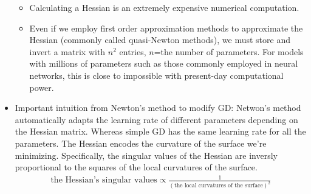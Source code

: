 \documentclass[norsk,a4paper,11pt]{article}
\begin{document}
\begin{itemize}
		\begin{itemize}
			\item Calculating a Hessian is an extremely expensive numerical computation.
			\item Even if we employ first order approximation methods to approximate the Hessian (commonly called quasi-Newton methods), we must store and invert a matrix with $n^2$ entries, $n$=the number of parameters. For models with millions of parameters such as those commonly employed in neural networks, this is close to impossible with present-day computational power. 
		\end{itemize}
		\item Important intuition from Newton's method to modify GD: Netwon's method automatically adapts the learning rate of different parameters depending on the Hessian matrix. Whereas simple GD has the same learning rate for all the parameters. The Hessian encodes the curvature of the surface we're minimizing. Specifically, the singular values of the Hessian are inversly proportional to the squares of the local curvatures of the surface.
		{\tiny
		\begin{align}
			\text{the Hessian's singular values} \propto \frac{1}{(\text{the local curvatures of the surface})^2}
		\end{align}}


\end{itemize}
\end{document}
